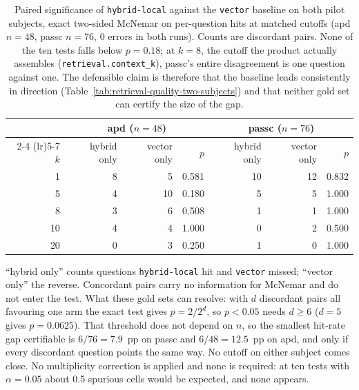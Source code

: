 \begin{table}[htbp]
  \centering
  \caption{Paired significance of \texttt{hybrid-local} against the \texttt{vector} baseline on
    both pilot subjects, exact two-sided McNemar on per-question hits at matched cutoffs (apd
    $n=48$, passc $n=76$, 0 errors in both runs). Counts are discordant pairs. None of the ten
    tests falls below $p=0.18$; at $k=8$, the cutoff the product actually assembles
    (\texttt{retrieval.context\_k}), passc's entire disagreement is one question against one. The
    defensible claim is therefore that the baseline leads consistently in direction
    (Table~\ref{tab:retrieval-quality-two-subjects}) and that neither gold set can certify the size
    of the gap.}
  \label{tab:retrieval-mcnemar-two-subjects}
  \begin{tabular}{rrrrrrr}
    \toprule
    & \multicolumn{3}{c}{apd ($n=48$)} & \multicolumn{3}{c}{passc ($n=76$)} \\
    \cmidrule(lr){2-4} \cmidrule(lr){5-7}
    $k$ & hybrid only & vector only & $p$ & hybrid only & vector only & $p$ \\
    \midrule
     1 & 8 &  5 & 0.581 & 10 & 12 & 0.832 \\
     5 & 4 & 10 & 0.180 &  5 &  5 & 1.000 \\
     8 & 3 &  6 & 0.508 &  1 &  1 & 1.000 \\
    10 & 4 &  4 & 1.000 &  0 &  2 & 0.500 \\
    20 & 0 &  3 & 0.250 &  1 &  0 & 1.000 \\
    \bottomrule
  \end{tabular}

  \vspace{0.5em}
  \footnotesize
  ``hybrid only'' counts questions \texttt{hybrid-local} hit and \texttt{vector} missed; ``vector
  only'' the reverse. Concordant pairs carry no information for McNemar and do not enter the test.
  What these gold sets can resolve: with $d$ discordant pairs all favouring one arm the exact test
  gives $p = 2/2^{d}$, so $p<0.05$ needs $d \ge 6$ ($d=5$ gives $p=0.0625$). That threshold does
  not depend on $n$, so the smallest hit-rate gap certifiable is $6/76 = 7.9$~pp on passc and
  $6/48 = 12.5$~pp on apd, and only if every discordant question points the same way. No cutoff on
  either subject comes close. No multiplicity correction is applied and none is required: at ten
  tests with $\alpha=0.05$ about 0.5 spurious cells would be expected, and none appears.
\end{table}
